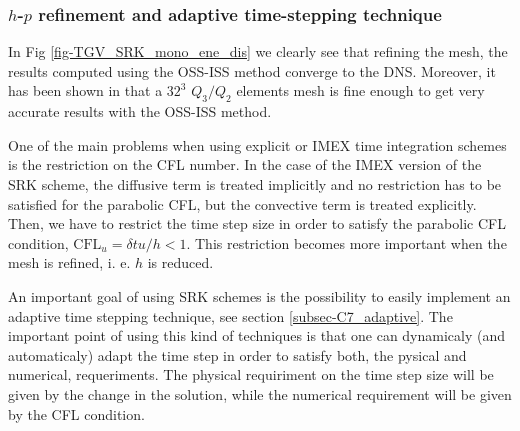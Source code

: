 
\subsubsection{$h$-$p$ refinement and adaptive time-stepping technique}
\label{subsubsec-C7_TGV_hp_refinement}
In Fig \ref{fig-TGV_SRK_mono_ene_dis} we clearly see that refining the mesh, the results computed using the OSS-ISS method converge to the DNS. Moreover, it has been shown in  that a $ 32^3 $ $ Q_3/Q_2 $ elements mesh is fine enough to get very accurate results with the OSS-ISS method.

One of the main problems when using explicit or IMEX time integration schemes is the restriction on the CFL number. In the case of the IMEX version of the SRK scheme, the diffusive term is treated implicitly and no restriction has to be satisfied for the parabolic CFL, but the convective term is treated explicitly. Then, we have to restrict the time step size in order to satisfy the parabolic CFL condition, $ \mbox{CFL}_u=\delta tu/h<1 $. This restriction becomes more important when the mesh is refined, i. e. $ h $ is reduced.

An important goal of using SRK schemes is the possibility to easily implement an adaptive time stepping technique, see section \ref{subsec-C7_adaptive}. The important point of using this kind of techniques is that one can dynamicaly (and automaticaly) adapt the time step in order to satisfy both, the pysical and numerical, requeriments. The physical requiriment on the time step size will be given by the change in the solution, while the numerical requirement will be given by the CFL condition.

